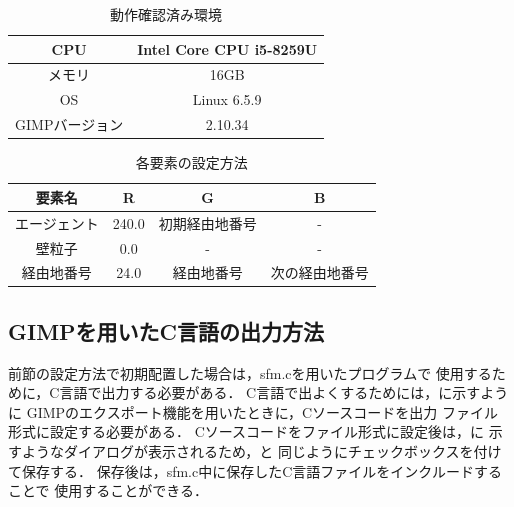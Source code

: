 \begin{table}[t]
  \begin{center}
    \caption{動作確認済み環境}
    \label{tb:conform_env}
    \begin{tabular}{c|c}
      \hline \hline
      CPU              & Intel Core CPU i5-8259U    \\ \hline
      メモリ            & 16GB                       \\ \hline
      OS               & Linux 6.5.9                 \\ \hline
      GIMPバージョン    & 2.10.34 \\ \hline
    \end{tabular}
  \end{center}
\end{table}

\begin{table}[t]
  \begin{center}
    \caption{各要素の設定方法}
    \label{tb:rgb_settings}
    \begin{tabular}{c|c|c|c}
      \hline \hline
      要素名        & R     & G & B \\ \hline
      エージェント   & 240.0 & 初期経由地番号 & - \\ \hline
      壁粒子         & 0.0    & - & -\\ \hline
      経由地番号      & 24.0  & 経由地番号 & 次の経由地番号 \\ \hline
    \end{tabular}
  \end{center}
\end{table}

\subsection{GIMPを用いたC言語の出力方法}
前節の設定方法で初期配置した場合は，sfm.cを用いたプログラムで
使用するために，C言語で出力する必要がある．
C言語で出よくするためには，に示すように
GIMPのエクスポート機能を用いたときに，Cソースコードを出力
ファイル形式に設定する必要がある．
Cソースコードをファイル形式に設定後は，に
示すようなダイアログが表示されるため，と
同じようにチェックボックスを付けて保存する．
保存後は，sfm.c中に保存したC言語ファイルをインクルードすることで
使用することができる．

